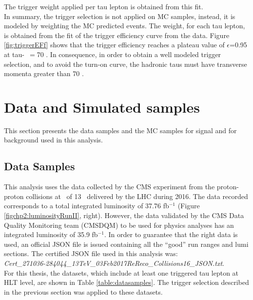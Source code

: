 \noindent The trigger weight applied per tau lepton is obtained from 
this fit.\\

\noindent In summary, the trigger selection is not applied on MC samples, instead, it
is modeled by weighting the MC predicted events. The weight, for each tau lepton, is 
obtained from the fit of the trigger efficiency curve from the 
data. Figure \ref{fig:triggerEFf} shows that the trigger efficiency reaches 
a plateau value of $\epsilon$=0.95 at tau-\pt~$=$70 \GeV. In consequence, in order to obtain
a well modeled trigger selection, and to avoid the turn-on curve, the hadronic taus must have 
transverse momenta greater than 70 \GeV.

\section{Data and Simulated samples}
\label{sec:Samples}

This section presents the data samples and  the MC samples
for signal and for background used in this analysis.

\subsection{Data Samples}
\label{subsec:Data}

This analysis uses the data collected by the CMS experiment
from the proton-proton collisions at 
\centermassenergy~of 13 \TeV~delivered by the LHC during 2016. The data 
recorded corresponds to a total integrated 
luminosity of 37.76 fb$^{-1}$ (Figure \ref{figchp2:luminosityRunII}, right). However, 
the data validated by the CMS Data Quality Monitoring team (CMSDQM) to be used 
for physics analyses has an integrated luminosity of 35.9 fb$^{-1}$. In order to guarantee 
that the right data is used, an official JSON file is issued containing all 
the ``good'' run ranges and lumi sections. The certified JSON file 
used in this analysis was:\\

\textit{Cert\_271036-284044\_13TeV\_03Feb2017ReReco\_Collisions16\_JSON.txt}. \\

\noindent For this thesis, the datasets, which include at least one triggered tau lepton at HLT
level, are shown in Table \ref{table:datasamples}. The trigger 
selection described in the previous section was applied to these datasets.


